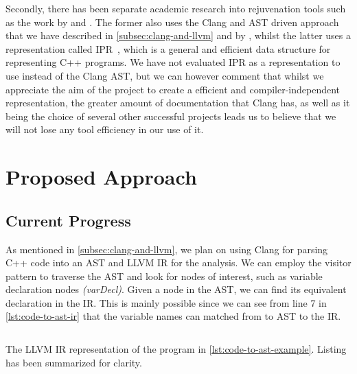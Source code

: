 \documentclass{proposal}
\begin{document}
    Secondly, there has been separate academic research into rejuvenation tools such as the work by \citet{Huck2016} and \citet{Kumar2012}.
    The former also uses the Clang and AST driven approach that we have described in \autoref{subsec:clang-and-llvm} and by \citet{Wright2013}, whilst the latter uses a representation called IPR~\cite{Dos2011}, which is a general and efficient data structure for representing C++ programs.
    We have not evaluated IPR as a representation to use instead of the Clang AST, but we can however comment that whilst we appreciate the aim of the project to create a efficient and compiler-independent representation, the greater amount of documentation that Clang has, as well as it being the choice of several other successful projects leads us to believe that we will not lose any tool efficiency in our use of it.




    \section{Proposed Approach}\label{sec:proposed-approach}


    \subsection{Current Progress}\label{subsec:current-progress}

    As mentioned in \autoref{subsec:clang-and-llvm}, we plan on using Clang for parsing C++ code into an AST and LLVM IR for the analysis.
    We can employ the visitor pattern to traverse the AST and look for nodes of interest, such as variable declaration nodes \emph{(varDecl)}.
    Given a node in the AST, we can find its equivalent declaration in the IR\@.
    This is mainly possible since we can see from line 7 in \autoref{lst:code-to-ast-ir} that the variable names can matched from to AST to the IR\@.

    \begin{listing}
        \inputminted[fontsize=\footnotesize, breaklines]{llvm}{code/code-to-ast-summary.ll}
        \caption{The LLVM IR representation of the program in \autoref{lst:code-to-ast-example}. Listing has been summarized for clarity.}
        \label{lst:code-to-ast-ir}
    \end{listing}
\end{document}
